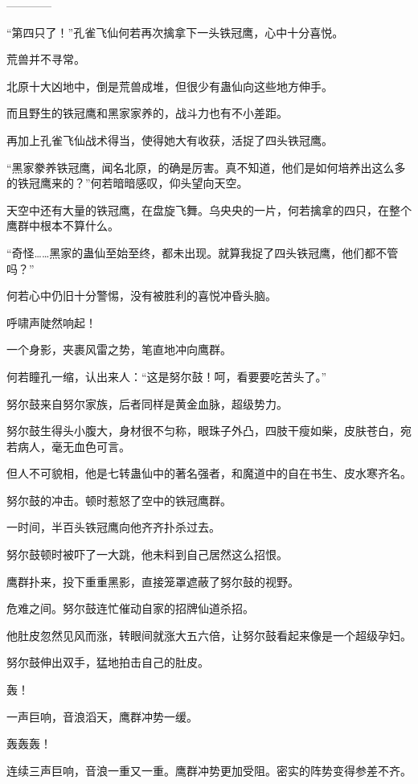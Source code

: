 
\begin{this_body}

------------

“第四只了！”孔雀飞仙何若再次擒拿下一头铁冠鹰，心中十分喜悦。

荒兽并不寻常。

北原十大凶地中，倒是荒兽成堆，但很少有蛊仙向这些地方伸手。

而且野生的铁冠鹰和黑家家养的，战斗力也有不小差距。

再加上孔雀飞仙战术得当，使得她大有收获，活捉了四头铁冠鹰。

“黑家豢养铁冠鹰，闻名北原，的确是厉害。真不知道，他们是如何培养出这么多的铁冠鹰来的？”何若暗暗感叹，仰头望向天空。

天空中还有大量的铁冠鹰，在盘旋飞舞。乌央央的一片，何若擒拿的四只，在整个鹰群中根本不算什么。

“奇怪……黑家的蛊仙至始至终，都未出现。就算我捉了四头铁冠鹰，他们都不管吗？”

何若心中仍旧十分警惕，没有被胜利的喜悦冲昏头脑。

呼啸声陡然响起！

一个身影，夹裹风雷之势，笔直地冲向鹰群。

何若瞳孔一缩，认出来人：“这是努尔鼓！呵，看要要吃苦头了。”

努尔鼓来自努尔家族，后者同样是黄金血脉，超级势力。

努尔鼓生得头小腹大，身材很不匀称，眼珠子外凸，四肢干瘦如柴，皮肤苍白，宛若病人，毫无血色可言。

但人不可貌相，他是七转蛊仙中的著名强者，和魔道中的自在书生、皮水寒齐名。

努尔鼓的冲击。顿时惹怒了空中的铁冠鹰群。

一时间，半百头铁冠鹰向他齐齐扑杀过去。

努尔鼓顿时被吓了一大跳，他未料到自己居然这么招恨。

鹰群扑来，投下重重黑影，直接笼罩遮蔽了努尔鼓的视野。

危难之间。努尔鼓连忙催动自家的招牌仙道杀招。

他肚皮忽然见风而涨，转眼间就涨大五六倍，让努尔鼓看起来像是一个超级孕妇。

努尔鼓伸出双手，猛地拍击自己的肚皮。

轰！

一声巨响，音浪滔天，鹰群冲势一缓。

轰轰轰！

连续三声巨响，音浪一重又一重。鹰群冲势更加受阻。密实的阵势变得参差不齐。


\end{this_body}
